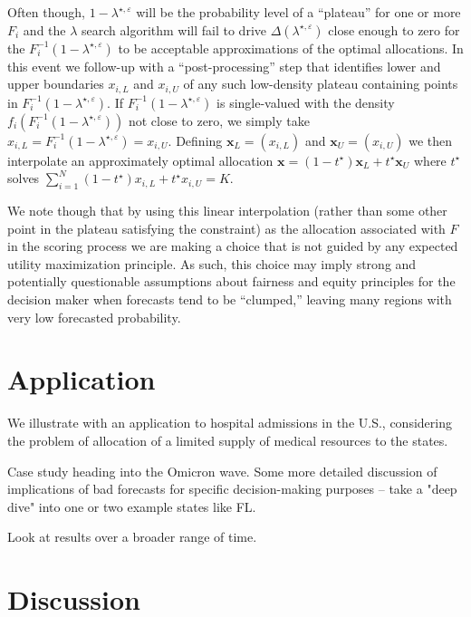 \documentclass{article}
\begin{document}
Often though, $1-\lambda^{\star, \varepsilon}$ will be the probability level of a ``plateau'' for one or more $F_i$ and the $\lambda$ search algorithm will fail to drive $\Delta(\lambda^{\star, \varepsilon})$ close enough to zero for the $F_{i}^{-1}(1-\lambda^{\star, \varepsilon})$ to be acceptable approximations of the optimal allocations. In this event we follow-up with a ``post-processing'' step that identifies lower and upper boundaries $x_{i,L}$ and $x_{i,U}$ of any
such low-density plateau containing points in $F_{i}^{-1}(1-\lambda^{\star, \varepsilon})$. If $F_{i}^{-1}(1-\lambda^{\star, \varepsilon})$ is single-valued 
with the density $f_i(F_{i}^{-1}(1-\lambda^{\star, \varepsilon}))$ not close to zero, we simply take $x_{i,L} = F_{i}^{-1}(1-\lambda^{\star, \varepsilon}) = x_{i,U}$. Defining $\mathbf{x}_L = (x_{i,L})$ and $\mathbf{x}_U = (x_{i,U})$ we then interpolate an approximately optimal allocation 
$\mathbf{x} = (1-t^{\star})\mathbf{x}_L + t^{\star}\mathbf{x}_U$ where $t^{\star}$ solves 
$\sum_{i=1}^{N }(1-t^{\star})x_{i,L} + t^{\star}x_{i,U} = K$.

We note though that by using this linear interpolation (rather than some other point in the plateau satisfying the constraint) as the allocation associated with $F$ in the scoring process we are making a choice that is not
guided by any expected utility maximization principle. As such, this choice may imply strong and potentially questionable assumptions about fairness and
equity principles for the decision maker when forecasts tend to be ``clumped,'' leaving many regions with very low forecasted probability.


\section{Application}
\label{sec:application}

We illustrate with an application to hospital admissions in the U.S., considering the problem of allocation of a limited supply of medical resources to {}the states.

Case study heading into the Omicron wave. Some more detailed discussion of implications of bad forecasts for specific decision-making purposes -- take a "deep dive" into one or two example states like FL.

Look at results over a broader range of time.

\section{Discussion}
\label{sec:discussion}
\end{document}
